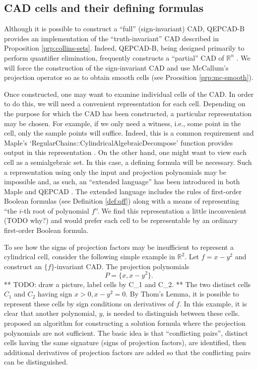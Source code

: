 \documentclass[
]{book}
\theoremstyle{definition}
\theoremstyle{definition}
\theoremstyle{definition}
\theoremstyle{definition}
\theoremstyle{remark}
\begin{document}
\hypertarget{cad-cells-and-their-defining-formulas}{%
\subsection{CAD cells and their defining formulas}\label{cad-cells-and-their-defining-formulas}}

Although it is possible to construct a ``full'' (sign-invariant) CAD, QEPCAD-B provides an implementation of the ``truth-invariant'' CAD described in Proposition \ref{prp:collins-sets}. Indeed, QEPCAD-B, being designed primarily to perform quantifier elimination, frequently constructs a ``partial'' CAD of \(\mathbb{R}^n\) \citep{brownQepcad}.
We will force the construction of the sign-invariant CAD and use McCallum's projection operator so as to obtain smooth cells (see Proosition \ref{prp:mc-smooth}).

Once constructed, one may want to examine individual cells of the CAD.
In order to do this, we will need a convenient representation for each cell.
Depending on the purpose for which the CAD has been constructed, a particular representation may be chosen. For example, if we only need a witness, i.e., some point in the cell, only the sample points will suffice. Indeed, this is a common requirement and Maple's `RegularChains::CylindricalAlgebraicDecompose' function provides output in this representation \citep{chen2014}.
On the other hand, one might want to view each cell as a semialgebraic set. In this case, a defining formula will be necessary.
Such a representation using only the input and projection polynomials may be impossible and, as such, an ``extended language'' has been introduced in both Maple and QEPCAD \citep[\citet{brownQepcad}]{chen2014}. The extended language includes the rules of first-order Boolean formulas (see Definition \ref{def:qff}) along with a means of representing ``the \(i\)-th root of polynomial \(f\)''. We find this representation a little inconvenient (TODO why?) and would prefer each cell to be representable by an ordinary first-order Boolean formula.

To see how the signs of projection factors may be insufficient to represent a cylindrical cell, consider the following simple example in \(\mathbb{R}^2\).
Let \(f = x - y^2\) and construct an \(\{f\}\)-invariant CAD. The projection polynomials
\[
P = \{ x, x - y^2 \}.
\]
** TODO: draw a picture, label cells by C\_1 and C\_2. **
The two distinct cells \(C_1\) and \(C_2\) having sign \(x > 0, x - y^2 = 0\). By Thom's Lemma, it is possible to represent these cells by sign conditions on derivatives of \(f\).
In this example, it is clear that another polynomial, \(y\), is needed to distinguish between these cells. \citet{brown99} proposed an algorithm for constructing a solution formula where the projection polynomials are not sufficient. The basic idea is that ``conflicting pairs'', distinct cells having the same signature (signs of projection factors), are identified, then additional derivatives of projection factors are added so that the conflicting pairs can be distinguished.
\end{document}
